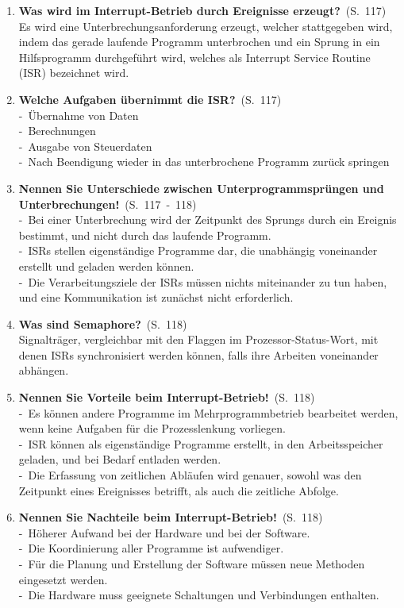 \documentclass[a4paper,12pt]{article}
\newcommand{\question}[3]{\pagebreak[3]\item {\textbf{#1?}}\ (S.\ #2)#3}
\newcommand{\statement}[3]{\pagebreak[3]\item {\textbf{#1!}}\ (S.\ #2)#3}
\newcommand{\catchword}[1]{\\-\ #1}
\newcommand{\normaltext}[1]{\\#1}
\newcommand{\page}[1]{#1}
\newcommand{\pages}[2]{#1\ -\ #2}
\begin{document}
\begin{enumerate}
  \question{Was wird im Interrupt-Betrieb durch Ereignisse erzeugt}{\page{117}}
  {
    \normaltext{Es wird eine Unterbrechungsanforderung erzeugt, welcher stattgegeben wird, indem das gerade
                laufende Programm unterbrochen und ein Sprung in ein Hilfsprogramm durchgeführt wird,
                welches als Interrupt Service Routine (ISR) bezeichnet wird.}
  }

  \question{Welche Aufgaben übernimmt die ISR}{\page{117}}
  {
    \catchword{Übernahme von Daten}
    \catchword{Berechnungen}
    \catchword{Ausgabe von Steuerdaten}
    \catchword{Nach Beendigung wieder in das unterbrochene Programm zurück springen}
  }

  \statement{Nennen Sie Unterschiede zwischen Unterprogrammsprüngen und Unterbrechungen}{\pages{117}{118}}
  {
    \catchword{Bei einer Unterbrechung wird der Zeitpunkt des Sprungs durch ein Ereignis bestimmt, und 
               nicht durch das laufende Programm.}
    \catchword{ISRs stellen eigenständige Programme dar, die unabhängig voneinander erstellt und geladen
               werden können.}
    \catchword{Die Verarbeitungsziele der ISRs müssen nichts miteinander zu tun haben, und eine Kommunikation
               ist zunächst nicht erforderlich.}
  }

  \question{Was sind Semaphore}{\page{118}}
  {
    \normaltext{Signalträger, vergleichbar mit den Flaggen im Prozessor-Status-Wort, mit denen ISRs 
                synchronisiert werden können, falls ihre Arbeiten voneinander abhängen.}
  }

  \statement{Nennen Sie Vorteile beim Interrupt-Betrieb}{\page{118}}
  {
    \catchword{Es können andere Programme im Mehrprogrammbetrieb bearbeitet werden, wenn keine Aufgaben für die 
               Prozesslenkung vorliegen.}
    \catchword{ISR können als eigenständige Programme erstellt, in den Arbeitsspeicher geladen, und bei Bedarf 
               entladen werden.}
    \catchword{Die Erfassung von zeitlichen Abläufen wird genauer, sowohl was den Zeitpunkt eines Ereignisses
               betrifft, als auch die zeitliche Abfolge.}
  }

  \statement{Nennen Sie Nachteile beim Interrupt-Betrieb}{\page{118}}
  {
    \catchword{Höherer Aufwand bei der Hardware und bei der Software.}
    \catchword{Die Koordinierung aller Programme ist aufwendiger.}
    \catchword{Für die Planung und Erstellung der Software müssen neue Methoden eingesetzt werden.}
    \catchword{Die Hardware muss geeignete Schaltungen und Verbindungen enthalten.}
  }


\end{enumerate}
\end{document}

